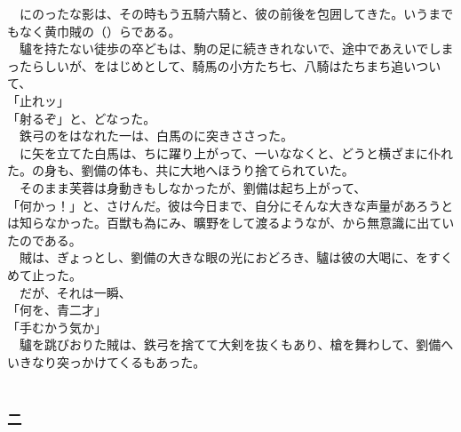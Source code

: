 \documentclass[
  paper=a5,
  fontsize=10pt,
  jafontsize=9.5pt,
  tate,                  %
  open_bracket_pos=nibu, %
]{jlreq}
\begin{document}
　にのったな影は、その時もう五騎六騎と、彼の前後を包囲してきた。いうまでもなく黄巾賊の（）らである。\\


　驢を持たない徒歩の卒どもは、駒の足に続ききれないで、途中であえいでしまったらしいが、をはじめとして、騎馬の小方たち七、八騎はたちまち追いついて、\\


「止れッ」\\


「射るぞ」と、どなった。\\


　鉄弓のをはなれた一は、白馬のに突きささった。\\


　に矢を立てた白馬は、ちに躍り上がって、一いななくと、どうと横ざまに仆れた。の身も、劉備の体も、共に大地へほうり捨てられていた。\\


　そのまま芙蓉は身動きもしなかったが、劉備は起ち上がって、\\


「何かっ！」と、さけんだ。彼は今日まで、自分にそんな大きな声量があろうとは知らなかった。百獣も為にみ、曠野をして渡るようなが、から無意識に出ていたのである。\\


　賊は、ぎょっとし、劉備の大きな眼の光におどろき、驢は彼の大喝に、をすくめて止った。\\


　だが、それは一瞬、\\


「何を、青二才」\\


「手むかう気か」\\


　驢を跳びおりた賊は、鉄弓を捨てて大剣を抜くもあり、槍を舞わして、劉備へいきなり突っかけてくるもあった。\\

\\

\subsubsection{二}
\end{document}
